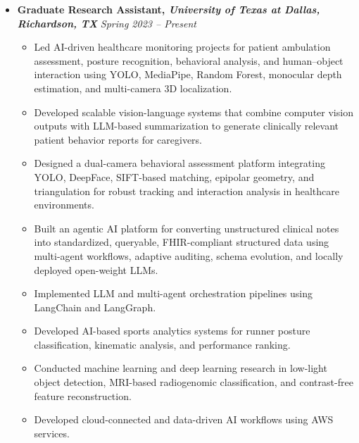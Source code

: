 \documentclass[10pt,a4paper,sans]{moderncv}
\begin{document}
\begin{itemize}[leftmargin=0.0 cm, label={}]

    \item \textbf{Graduate Research Assistant, \textit{University of Texas at Dallas, Richardson, TX}} \hfill \textit{Spring 2023 -- Present}
    \begin{itemize}[leftmargin=0.6cm, label={\textbullet}]
        \item Led AI-driven healthcare monitoring projects for patient ambulation assessment, posture recognition, behavioral analysis, and human--object interaction using YOLO, MediaPipe, Random Forest, monocular depth estimation, and multi-camera 3D localization.
        \item Developed scalable vision-language systems that combine computer vision outputs with LLM-based summarization to generate clinically relevant patient behavior reports for caregivers.
        \item Designed a dual-camera behavioral assessment platform integrating YOLO, DeepFace, SIFT-based matching, epipolar geometry, and triangulation for robust tracking and interaction analysis in healthcare environments.
        \item Built an agentic AI platform for converting unstructured clinical notes into standardized, queryable, FHIR-compliant structured data using multi-agent workflows, adaptive auditing, schema evolution, and locally deployed open-weight LLMs.
        \item Implemented LLM and multi-agent orchestration pipelines using LangChain and LangGraph. 
        \item Developed AI-based sports analytics systems for runner posture classification, kinematic analysis, and performance ranking. 
        \item Conducted machine learning and deep learning research in low-light object detection, MRI-based radiogenomic classification, and contrast-free feature reconstruction.
        \item Developed cloud-connected and data-driven AI workflows using AWS services. 
    \end{itemize}


\end{itemize}
\end{document}
